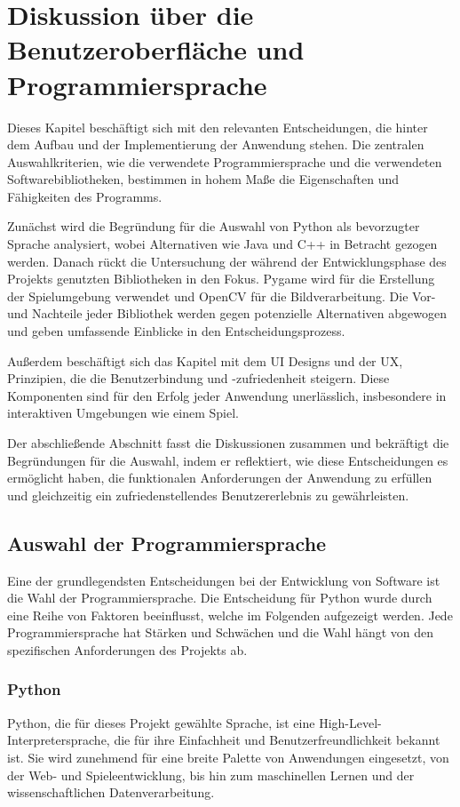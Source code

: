 
\chapter{Diskussion über die Benutzeroberfläche und Programmiersprache}
Dieses Kapitel beschäftigt sich  mit den relevanten Entscheidungen, die hinter dem Aufbau und der Implementierung der Anwendung stehen. 
Die zentralen Auswahlkriterien, wie die verwendete Programmiersprache und die verwendeten Softwarebibliotheken, 
bestimmen in hohem Maße die Eigenschaften und Fähigkeiten des Programms.

Zunächst wird die Begründung für die Auswahl von Python als bevorzugter Sprache analysiert, 
wobei Alternativen wie Java und C++ in Betracht gezogen werden. Danach rückt die Untersuchung der während der Entwicklungsphase 
des Projekts genutzten Bibliotheken in den Fokus. Pygame wird für die Erstellung der Spielumgebung verwendet und OpenCV für die Bildverarbeitung. 
Die Vor- und Nachteile jeder Bibliothek werden gegen potenzielle Alternativen abgewogen und geben umfassende Einblicke in den Entscheidungsprozess.

Außerdem beschäftigt sich das Kapitel mit dem \ac{UI} Designs und der \ac{UX}, 
Prinzipien, die die Benutzerbindung und -zufriedenheit steigern. Diese Komponenten sind für den Erfolg jeder Anwendung unerlässlich, 
insbesondere in interaktiven Umgebungen wie einem Spiel.

Der abschließende Abschnitt fasst die Diskussionen zusammen und bekräftigt die Begründungen für die Auswahl, indem er reflektiert, 
wie diese Entscheidungen es ermöglicht haben, die funktionalen Anforderungen der Anwendung zu erfüllen und gleichzeitig ein 
zufriedenstellendes Benutzererlebnis zu gewährleisten.

\section{Auswahl der Programmiersprache}
Eine der grundlegendsten Entscheidungen bei der Entwicklung von Software ist die Wahl der Programmiersprache. 
Die Entscheidung für Python wurde durch eine Reihe von Faktoren beeinflusst, welche im Folgenden aufgezeigt werden. 
Jede Programmiersprache hat Stärken und Schwächen und die Wahl hängt von den spezifischen Anforderungen des Projekts ab.

\subsection{Python}
Python, die für dieses Projekt gewählte Sprache, ist eine High-Level-Interpretersprache, die für ihre Einfachheit und Benutzerfreundlichkeit bekannt ist.
Sie wird zunehmend für eine breite Palette von Anwendungen eingesetzt, von der Web- und Spieleentwicklung,
bis hin zum maschinellen Lernen und der wissenschaftlichen Datenverarbeitung.

